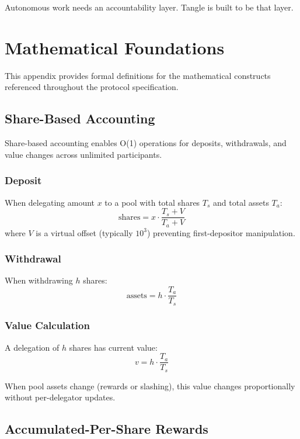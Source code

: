 \documentclass[11pt,a4paper]{article}
\begin{document}
Autonomous work needs an accountability layer. Tangle is built to be that layer.

\appendix

\section{Mathematical Foundations}

This appendix provides formal definitions for the mathematical constructs referenced throughout the protocol specification.

\subsection{Share-Based Accounting}
\label{sec:appendix-shares}

Share-based accounting enables O(1) operations for deposits, withdrawals, and value changes across unlimited participants.

\subsubsection{Deposit}

When delegating amount $x$ to a pool with total shares $T_s$ and total assets $T_a$:
\[
\text{shares} = x \cdot \frac{T_s + V}{T_a + V}
\]
where $V$ is a virtual offset (typically $10^3$) preventing first-depositor manipulation.

\subsubsection{Withdrawal}

When withdrawing $h$ shares:
\[
\text{assets} = h \cdot \frac{T_a}{T_s}
\]

\subsubsection{Value Calculation}

A delegation of $h$ shares has current value:
\[
v = h \cdot \frac{T_a}{T_s}
\]

When pool assets change (rewards or slashing), this value changes proportionally without per-delegator updates.

\subsection{Accumulated-Per-Share Rewards}
\end{document}
